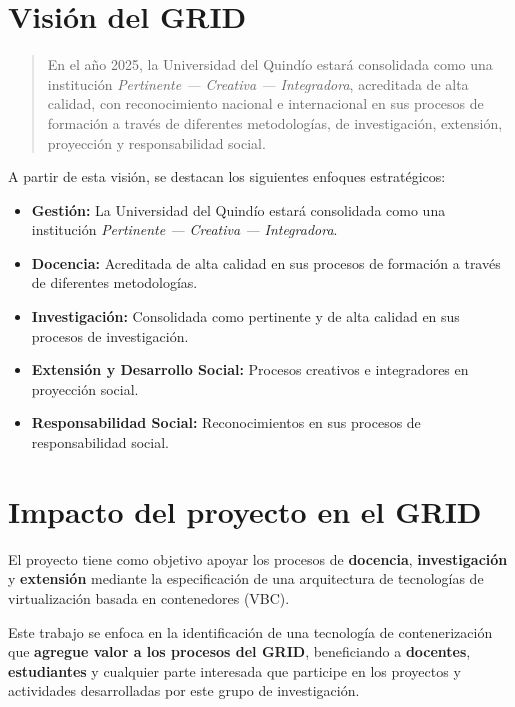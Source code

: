 \section{Visión del GRID}

\begin{quote}
En el año 2025, la Universidad del Quindío estará consolidada como una institución \textit{Pertinente --- Creativa --- Integradora}, acreditada de alta calidad, con reconocimiento nacional e internacional en sus procesos de formación a través de diferentes metodologías, de investigación, extensión, proyección y responsabilidad social.
\end{quote}

A partir de esta visión, se destacan los siguientes enfoques estratégicos:

\begin{itemize}
    \item \textbf{Gestión:} La Universidad del Quindío estará consolidada como una institución \textit{Pertinente --- Creativa --- Integradora}.

    \item \textbf{Docencia:} Acreditada de alta calidad en sus procesos de formación a través de diferentes metodologías.

    \item \textbf{Investigación:} Consolidada como pertinente y de alta calidad en sus procesos de investigación.

    \item \textbf{Extensión y Desarrollo Social:} Procesos creativos e integradores en proyección social.

    \item \textbf{Responsabilidad Social:} Reconocimientos en sus procesos de responsabilidad social.
\end{itemize}

\section{Impacto del proyecto en el GRID}

El proyecto tiene como objetivo apoyar los procesos de \textbf{docencia}, \textbf{investigación} 
y \textbf{extensión} mediante la especificación de una arquitectura de tecnologías de 
virtualización basada en contenedores (VBC). 

Este trabajo se enfoca en la identificación de una tecnología de contenerización que 
\textbf{agregue valor a los procesos del GRID}, beneficiando a \textbf{docentes}, \textbf{estudiantes} 
y cualquier parte interesada que participe en los proyectos y actividades desarrolladas 
por este grupo de investigación.

